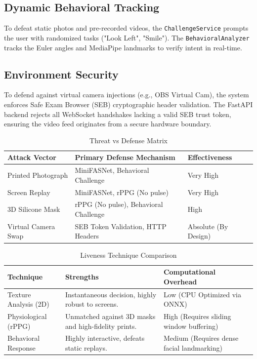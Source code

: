 \subsection{Dynamic Behavioral Tracking}
To defeat static photos and pre-recorded videos, the \texttt{ChallengeService} prompts the user with randomized tasks ("Look Left", "Smile"). The \texttt{BehavioralAnalyzer} tracks the Euler angles and MediaPipe landmarks to verify intent in real-time.

\subsection{Environment Security}
To defend against virtual camera injections (e.g., OBS Virtual Cam), the system enforces Safe Exam Browser (SEB) cryptographic header validation. The FastAPI backend rejects all WebSocket handshakes lacking a valid SEB trust token, ensuring the video feed originates from a secure hardware boundary.

\begin{table}[H]
\centering
\caption{Threat vs Defense Matrix}
\begin{tabularx}{\textwidth}{|l|l|X|}
\hline
\textbf{Attack Vector} & \textbf{Primary Defense Mechanism} & \textbf{Effectiveness} \\
\hline
Printed Photograph & MiniFASNet, Behavioral Challenge & Very High \\
Screen Replay & MiniFASNet, rPPG (No pulse) & Very High \\
3D Silicone Mask & rPPG (No pulse), Behavioral Challenge & High \\
Virtual Camera Swap & SEB Token Validation, HTTP Headers & Absolute (By Design) \\
\hline
\end{tabularx}
\end{table}

\begin{table}[H]
\centering
\caption{Liveness Technique Comparison}
\begin{tabularx}{\textwidth}{|X|X|X|}
\hline
\textbf{Technique} & \textbf{Strengths} & \textbf{Computational Overhead} \\
\hline
Texture Analysis (2D) & Instantaneous decision, highly robust to screens. & Low (CPU Optimized via ONNX) \\
Physiological (rPPG) & Unmatched against 3D masks and high-fidelity prints. & High (Requires sliding window buffering) \\
Behavioral Response & Highly interactive, defeats static replays. & Medium (Requires dense facial landmarking) \\
\hline
\end{tabularx}
\end{table}

